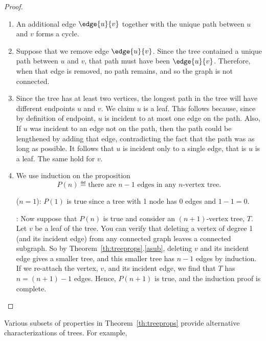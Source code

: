 \begin{proof}
\begin{enumerate}
\item An additional edge $\edge{u}{v}$ together with the unique path
  between $u$ and $v$ forms a cycle.

\item Suppose that we remove edge $\edge{u}{v}$.  Since the tree
  contained a unique path between $u$ and $v$, that path must have
  been $\edge{u}{v}$.  Therefore, when that edge is removed, no path
  remains, and so the graph is not connected.

\item
\begin{editingnotes}
\end{editingnotes}

  Since the tree has at least two vertices, the longest path in the
  tree will have different endpoints $u$ and $v$.  We claim $u$ is a
  leaf.  This follows because, since by definition of endpoint, $u$ is
  incident to at most one edge on the path.  Also, If $u$ was incident to
  an edge not on the path, then the path could be lengthened by adding
  that edge, contradicting the fact that the path was as long as
  possible.  It follows that $u$ is incident only to a single edge,
  that is $u$ is a leaf.  The same hold for $v$.

\item We use induction on the proposition
\[
P(n) \eqdef \text{there are $n - 1$ edges in any $n$-vertex tree}.
\]

 ($n = 1$): $P(1)$ is true since a tree with
1 node has 0 edges and $1 - 1 = 0$.

: Now suppose that $P(n)$ is true and
consider an $(n+1)$-vertex tree, $T$.  Let $v$ be a leaf of the tree.
You can verify that deleting a vertex of degree 1 (and its incident
edge) from any connected graph leaves a connected subgraph.  So by
Theorem~\ref{th:treeprops}.\ref{asub}, deleting $v$ and its
incident edge gives a smaller tree, and this smaller tree has $n - 1$
edges by induction.  If we re-attach the vertex, $v$, and its incident
edge, we find that $T$ has $n = (n + 1) - 1$ edges.  Hence, $P(n + 1)$
is true, and the induction proof is complete.  \qedhere

\end{enumerate}

\end{proof}

Various subsets of properties in Theorem~\ref{th:treeprops} provide
alternative characterizations of trees.  For example,


